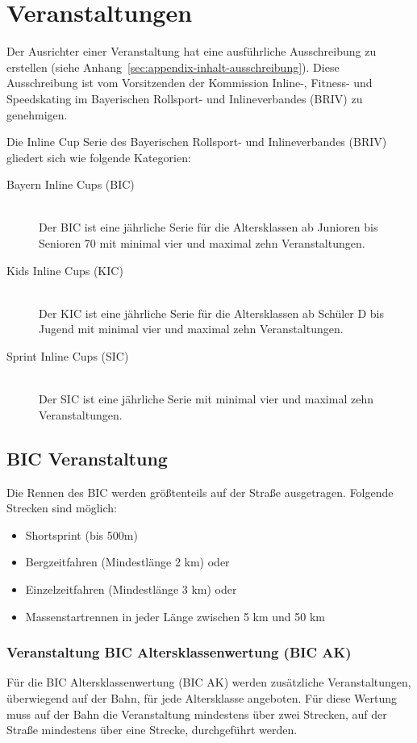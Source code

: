 \section{Veranstaltungen}
Der Ausrichter einer Veranstaltung hat eine ausführliche Ausschreibung zu erstellen (siehe Anhang~\ref{sec:appendix-inhalt-ausschreibung}). Diese Ausschreibung ist vom Vorsitzenden der Kommission Inline-, Fitness- und Speedskating im Bayerischen Rollsport- und Inlineverbandes (BRIV) zu genehmigen.

Die Inline Cup Serie des Bayerischen Rollsport- und Inlineverbandes (BRIV) gliedert sich wie folgende Kategorien:

\begin{description}
	\item[Bayern Inline Cups (BIC)] \hfill \\
	Der BIC ist eine jährliche Serie für die Altersklassen ab Junioren bis Senioren 70 mit minimal vier und maximal zehn Veranstaltungen.
	\item[Kids Inline Cups (KIC)] \hfill \\
	Der KIC ist eine jährliche Serie für die Altersklassen ab Schüler D bis Jugend mit minimal vier und maximal zehn Veranstaltungen.
	\item[Sprint Inline Cups (SIC)] \hfill \\
	Der SIC ist eine jährliche Serie mit minimal vier und maximal zehn Veranstaltungen.
\end{description}

\subsection{BIC Veranstaltung}
Die Rennen des BIC werden größtenteils auf der Straße ausgetragen. Folgende Strecken sind möglich:
\begin{itemize}
	\item Shortsprint (bis 500m)
	\item Bergzeitfahren (Mindestlänge 2 km) oder
	\item Einzelzeitfahren (Mindestlänge 3 km) oder
	\item Massenstartrennen in jeder Länge zwischen 5 km und 50 km
\end{itemize}

\subsubsection{Veranstaltung BIC Altersklassenwertung (BIC AK)}
Für die BIC Altersklassenwertung (BIC AK) werden zusätzliche Veranstaltungen, überwiegend auf der Bahn, für jede Altersklasse angeboten. Für diese Wertung muss auf der Bahn die Veranstaltung mindestens über zwei Strecken, auf der Straße mindestens über eine Strecke, durchgeführt werden.

